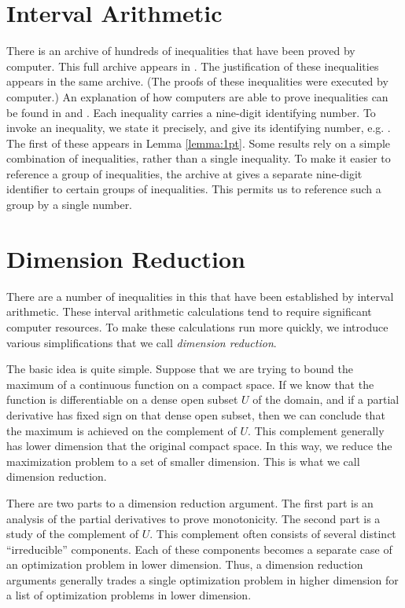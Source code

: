 
\chapter{Interval Arithmetic}%
\label{sec:bounds-simplex}


There is an archive of hundreds of
inequalities that have been proved by computer.  This full archive
appears in \cite{web}.  The justification of these inequalities
appears in the same archive.  (The proofs of these inequalities were
executed by computer.)  An explanation of how computers are able to
prove inequalities can be found in \cite{algorithm} and
\cite{part1}. Each inequality carries a nine-digit identifying
number. To invoke an inequality, we state it precisely, and give its
identifying number, e.g. . The first of these
appears in Lemma \ref{lemma:1pt}.  Some results rely on a simple
combination of inequalities, rather than a single inequality.  To
make it easier to reference a group of inequalities, the archive at
\cite{web} gives a separate nine-digit identifier to certain groups
of inequalities.  This permits us to reference such a group by a
single number.
%


\chapter{Dimension Reduction}\label{chap:reduction}

There are a number of inequalities in this \paper that have been
established by interval arithmetic.  These interval arithmetic
calculations tend to require significant computer resources.  To
make these calculations run more quickly, we introduce various
simplifications that we call {\it dimension reduction}.

The basic idea is quite simple.  Suppose that we are trying to
bound the maximum of a continuous function on a compact space.  If
we know that the function is differentiable on a dense open subset
$U$ of the domain, and if a partial derivative has fixed sign on
that dense open subset, then we can conclude that the maximum is
achieved on the complement of $U$.   This complement generally has
lower dimension that the original compact space.  In this way, we
reduce the maximization problem to a set of smaller dimension.
This is what we call dimension reduction.

There are two parts to a dimension reduction argument.  The first
part is an analysis of the partial derivatives to prove
monotonicity.  The second part is a study of the complement of
$U$.  This complement often consists of several distinct
``irreducible'' components.  Each of these components becomes a
separate case of an optimization problem in lower dimension. Thus,
a dimension reduction arguments generally trades a single
optimization problem in higher dimension for a list of
optimization problems in lower dimension.

